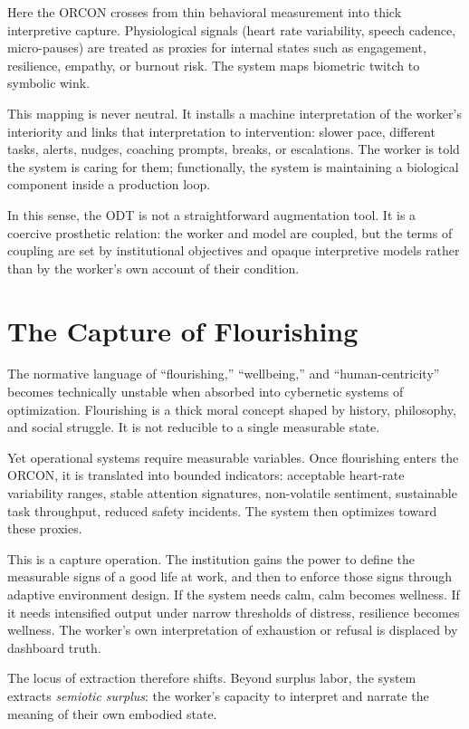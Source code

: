 \documentclass[runningheads]{llncs}
\begin{document}
Here the ORCON crosses from thin behavioral measurement into thick interpretive capture. Physiological signals (heart rate variability, speech cadence, micro-pauses) are treated as proxies for internal states such as engagement, resilience, empathy, or burnout risk. The system maps biometric twitch to symbolic wink.

This mapping is never neutral. It installs a machine interpretation of the worker's interiority and links that interpretation to intervention: slower pace, different tasks, alerts, nudges, coaching prompts, breaks, or escalations. The worker is told the system is caring for them; functionally, the system is maintaining a biological component inside a production loop.

In this sense, the ODT is not a straightforward augmentation tool. It is a coercive prosthetic relation: the worker and model are coupled, but the terms of coupling are set by institutional objectives and opaque interpretive models rather than by the worker's own account of their condition.

\section{The Capture of Flourishing}

The normative language of ``flourishing,'' ``wellbeing,'' and ``human-centricity'' becomes technically unstable when absorbed into cybernetic systems of optimization. Flourishing is a thick moral concept shaped by history, philosophy, and social struggle. It is not reducible to a single measurable state.

Yet operational systems require measurable variables. Once flourishing enters the ORCON, it is translated into bounded indicators: acceptable heart-rate variability ranges, stable attention signatures, non-volatile sentiment, sustainable task throughput, reduced safety incidents. The system then optimizes toward these proxies.

This is a capture operation. The institution gains the power to define the measurable signs of a good life at work, and then to enforce those signs through adaptive environment design. If the system needs calm, calm becomes wellness. If it needs intensified output under narrow thresholds of distress, resilience becomes wellness. The worker's own interpretation of exhaustion or refusal is displaced by dashboard truth.

The locus of extraction therefore shifts. Beyond surplus labor, the system extracts \emph{semiotic surplus}: the worker's capacity to interpret and narrate the meaning of their own embodied state.
\end{document}
